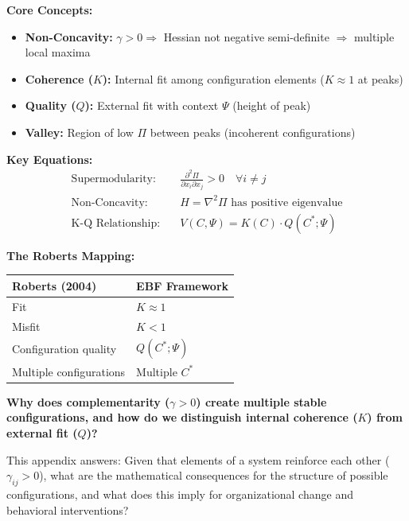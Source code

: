 \begin{tcolorbox}[colback=blue!5!white, colframe=blue!75!black,
    title=\textbf{Quick Reference: Non-Concavity and Fit}]

\textbf{Core Concepts:}
\begin{itemize}[nosep]
\item \textbf{Non-Concavity:} $\gamma > 0 \Rightarrow$ Hessian not negative semi-definite $\Rightarrow$ multiple local maxima
\item \textbf{Coherence ($K$):} Internal fit among configuration elements ($K \approx 1$ at peaks)
\item \textbf{Quality ($Q$):} External fit with context $\Psi$ (height of peak)
\item \textbf{Valley:} Region of low $\Pi$ between peaks (incoherent configurations)
\end{itemize}

\textbf{Key Equations:}
\begin{align}
\text{Supermodularity:} \quad & \frac{\partial^2 \Pi}{\partial x_i \partial x_j} > 0 \quad \forall i \neq j \label{eq:nc-supermod} \\
\text{Non-Concavity:} \quad & H = \nabla^2 \Pi \text{ has positive eigenvalue} \label{eq:nc-hessian} \\
\text{K-Q Relationship:} \quad & V(C, \Psi) = K(C) \cdot Q(C^*; \Psi) \label{eq:nc-kq}
\end{align}

\textbf{The Roberts Mapping:}
\begin{center}
\renewcommand{\arraystretch}{1.2}
\begin{tabular}{ll}
Roberts (2004) & EBF Framework \\
\hline
Fit & $K \approx 1$ \\
Misfit & $K < 1$ \\
Configuration quality & $Q(C^*; \Psi)$ \\
Multiple configurations & Multiple $C^*$ \\
\end{tabular}
\end{center}

\end{tcolorbox}


\begin{tcolorbox}[colback=orange!5!white, colframe=orange!75!black,
    title=\textbf{Fundamental Question}]
\textbf{Why does complementarity ($\gamma > 0$) create multiple stable configurations, and how do we distinguish internal coherence ($K$) from external fit ($Q$)?}

This appendix answers: Given that elements of a system reinforce each other ($\gamma_{ij} > 0$), what are the mathematical consequences for the structure of possible configurations, and what does this imply for organizational change and behavioral interventions?
\end{tcolorbox}

